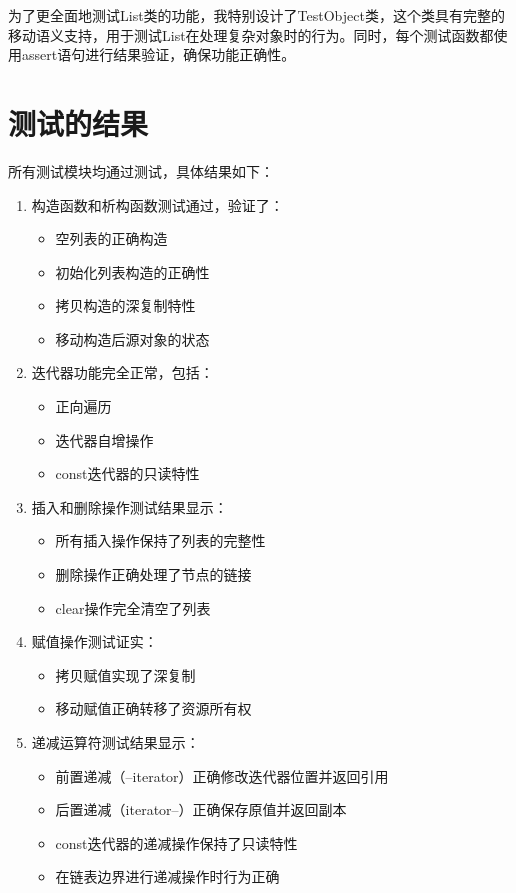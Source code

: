 \documentclass[UTF8]{ctexart}
\begin{document}
为了更全面地测试List类的功能，我特别设计了TestObject类，这个类具有完整的移动语义支持，用于测试List在处理复杂对象时的行为。同时，每个测试函数都使用assert语句进行结果验证，确保功能正确性。

\section{测试的结果}

所有测试模块均通过测试，具体结果如下：

\begin{enumerate}
    \item 构造函数和析构函数测试通过，验证了：
    \begin{itemize}
        \item 空列表的正确构造
        \item 初始化列表构造的正确性
        \item 拷贝构造的深复制特性
        \item 移动构造后源对象的状态
    \end{itemize}
    
    \item 迭代器功能完全正常，包括：
    \begin{itemize}
        \item 正向遍历
        \item 迭代器自增操作
        \item const迭代器的只读特性
    \end{itemize}
    
    \item 插入和删除操作测试结果显示：
    \begin{itemize}
        \item 所有插入操作保持了列表的完整性
        \item 删除操作正确处理了节点的链接
        \item clear操作完全清空了列表
    \end{itemize}
    
    \item 赋值操作测试证实：
    \begin{itemize}
        \item 拷贝赋值实现了深复制
        \item 移动赋值正确转移了资源所有权
    \end{itemize}

    \item 递减运算符测试结果显示：
    \begin{itemize}
    \item 前置递减（--iterator）正确修改迭代器位置并返回引用
    \item 后置递减（iterator--）正确保存原值并返回副本
    \item const迭代器的递减操作保持了只读特性
    \item 在链表边界进行递减操作时行为正确
    \end{itemize}
\end{enumerate}
\end{document}
